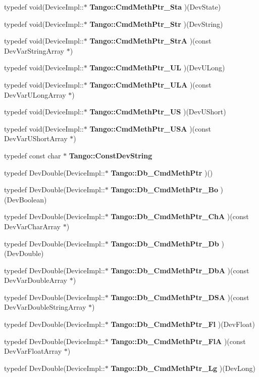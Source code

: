 \begin{DoxyCompactItemize}
\item 
typedef void(Device\-Impl\-::$\ast$ {\bf Tango\-::\-Cmd\-Meth\-Ptr\-\_\-\-Sta} )(Dev\-State)
\item 
typedef void(Device\-Impl\-::$\ast$ {\bf Tango\-::\-Cmd\-Meth\-Ptr\-\_\-\-Str} )(Dev\-String)
\item 
typedef void(Device\-Impl\-::$\ast$ {\bf Tango\-::\-Cmd\-Meth\-Ptr\-\_\-\-Str\-A} )(const Dev\-Var\-String\-Array $\ast$)
\item 
typedef void(Device\-Impl\-::$\ast$ {\bf Tango\-::\-Cmd\-Meth\-Ptr\-\_\-\-U\-L} )(Dev\-U\-Long)
\item 
typedef void(Device\-Impl\-::$\ast$ {\bf Tango\-::\-Cmd\-Meth\-Ptr\-\_\-\-U\-L\-A} )(const Dev\-Var\-U\-Long\-Array $\ast$)
\item 
typedef void(Device\-Impl\-::$\ast$ {\bf Tango\-::\-Cmd\-Meth\-Ptr\-\_\-\-U\-S} )(Dev\-U\-Short)
\item 
typedef void(Device\-Impl\-::$\ast$ {\bf Tango\-::\-Cmd\-Meth\-Ptr\-\_\-\-U\-S\-A} )(const Dev\-Var\-U\-Short\-Array $\ast$)
\item 
typedef const char $\ast$ {\bf Tango\-::\-Const\-Dev\-String}
\item 
typedef Dev\-Double(Device\-Impl\-::$\ast$ {\bf Tango\-::\-Db\-\_\-\-Cmd\-Meth\-Ptr} )()
\item 
typedef Dev\-Double(Device\-Impl\-::$\ast$ {\bf Tango\-::\-Db\-\_\-\-Cmd\-Meth\-Ptr\-\_\-\-Bo} )(Dev\-Boolean)
\item 
typedef Dev\-Double(Device\-Impl\-::$\ast$ {\bf Tango\-::\-Db\-\_\-\-Cmd\-Meth\-Ptr\-\_\-\-Ch\-A} )(const Dev\-Var\-Char\-Array $\ast$)
\item 
typedef Dev\-Double(Device\-Impl\-::$\ast$ {\bf Tango\-::\-Db\-\_\-\-Cmd\-Meth\-Ptr\-\_\-\-Db} )(Dev\-Double)
\item 
typedef Dev\-Double(Device\-Impl\-::$\ast$ {\bf Tango\-::\-Db\-\_\-\-Cmd\-Meth\-Ptr\-\_\-\-Db\-A} )(const Dev\-Var\-Double\-Array $\ast$)
\item 
typedef Dev\-Double(Device\-Impl\-::$\ast$ {\bf Tango\-::\-Db\-\_\-\-Cmd\-Meth\-Ptr\-\_\-\-D\-S\-A} )(const Dev\-Var\-Double\-String\-Array $\ast$)
\item 
typedef Dev\-Double(Device\-Impl\-::$\ast$ {\bf Tango\-::\-Db\-\_\-\-Cmd\-Meth\-Ptr\-\_\-\-Fl} )(Dev\-Float)
\item 
typedef Dev\-Double(Device\-Impl\-::$\ast$ {\bf Tango\-::\-Db\-\_\-\-Cmd\-Meth\-Ptr\-\_\-\-Fl\-A} )(const Dev\-Var\-Float\-Array $\ast$)
\item 
typedef Dev\-Double(Device\-Impl\-::$\ast$ {\bf Tango\-::\-Db\-\_\-\-Cmd\-Meth\-Ptr\-\_\-\-Lg} )(Dev\-Long)

\end{DoxyCompactItemize}
